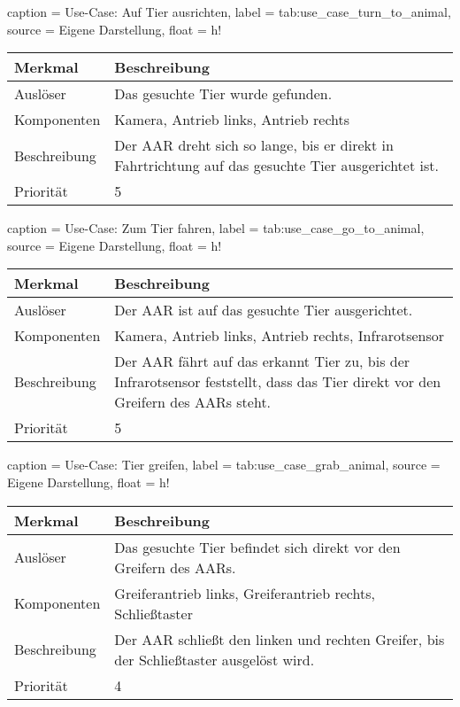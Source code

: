 \begin{dhbwtable}{%
    caption	= Use-Case: Auf Tier ausrichten,
    label	= tab:use_case_turn_to_animal,
    source	= Eigene Darstellung,
    float = h!
}
    \begin{tabularx}{\textwidth}{lX}
        \toprule
        \textbf{Merkmal}     & \textbf{Beschreibung}  \\\midrule
        Auslöser     & Das gesuchte Tier wurde gefunden.\\
        Komponenten  & Kamera, Antrieb links, Antrieb rechts\\
        Beschreibung & Der \ac{AAR} dreht sich so lange, bis er direkt in Fahrtrichtung auf das gesuchte Tier ausgerichtet ist.\\
        Priorität    & 5 \\\bottomrule
    \end{tabularx}    
\end{dhbwtable}

\begin{dhbwtable}{%
    caption	= Use-Case: Zum Tier fahren,
    label	= tab:use_case_go_to_animal,
    source	= Eigene Darstellung,
    float = h!
}
    \begin{tabularx}{\textwidth}{lX}
        \toprule
        \textbf{Merkmal}     & \textbf{Beschreibung}  \\\midrule
        Auslöser     & Der \ac{AAR} ist auf das gesuchte Tier ausgerichtet.\\
        Komponenten  & Kamera, Antrieb links, Antrieb rechts, Infrarotsensor\\
        Beschreibung & Der \ac{AAR} fährt auf das erkannt Tier zu, bis der Infrarotsensor feststellt, dass das Tier direkt vor den Greifern des \acp{AAR} steht.\\
        Priorität    & 5 \\\bottomrule
    \end{tabularx}    
\end{dhbwtable}

\begin{dhbwtable}{%
    caption	= Use-Case: Tier greifen,
    label	= tab:use_case_grab_animal,
    source	= Eigene Darstellung,
    float = h!
}
    \begin{tabularx}{\textwidth}{lX}
        \toprule
        \textbf{Merkmal}     & \textbf{Beschreibung}  \\\midrule
        Auslöser     & Das gesuchte Tier befindet sich direkt vor den Greifern des \acp{AAR}. \\
        Komponenten  & Greiferantrieb links, Greiferantrieb rechts, Schließtaster \\
        Beschreibung & Der \ac{AAR} schließt den linken und rechten Greifer, bis der Schließtaster ausgelöst wird.\\
        Priorität    & 4 \\\bottomrule
    \end{tabularx}    
\end{dhbwtable}

